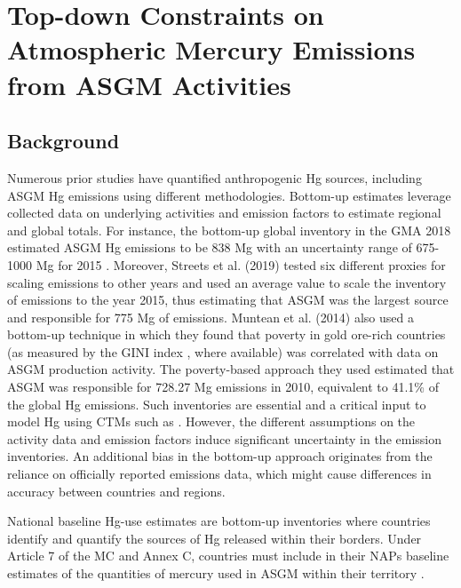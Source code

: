 \chapter{Top-down Constraints on Atmospheric Mercury Emissions from ASGM Activities}
\section{Background}
\begin{flushleft}


 Numerous prior studies have quantified anthropogenic Hg sources, including ASGM Hg emissions using different methodologies. Bottom-up estimates leverage collected data on underlying activities and emission factors to estimate regional and global totals. For instance, the bottom-up global inventory in the GMA 2018 estimated ASGM Hg emissions to be 838 Mg with an uncertainty range of 675-1000 Mg for 2015 \cite{united_nations_environment_programme_technical_2019,steenhuisen_development_2019}. Moreover, Streets et al. (2019) tested six different proxies for scaling emissions to other years and used an average value to scale the inventory of emissions to the year 2015, thus estimating that ASGM was the largest source and responsible for 775 Mg of emissions\cite{streets_global_2019}. Muntean et al. (2014) also used a bottom-up technique in which they found that poverty in gold ore-rich countries (as measured by the GINI index \cite{sadefo_kamdem_nice_2012}, where available) was correlated with data on ASGM production activity. The poverty-based approach they used estimated that ASGM was responsible for 728.27 Mg emissions in 2010, equivalent to 41.1\% of the global Hg emissions\cite{muntean_evaluating_2018}. Such inventories are essential and a critical input to model Hg using CTMs such as \gc. However, the different assumptions on the activity data and emission factors induce significant uncertainty in the emission inventories. An additional bias in the bottom-up approach originates from the reliance on officially reported emissions data, which might cause differences in accuracy between countries and regions. 
 \end{flushleft}
 \begin{flushleft}
    National baseline Hg-use estimates are bottom-up inventories where countries identify and quantify the sources of Hg released within their borders. Under Article 7 of the MC and Annex C, countries must include in their NAPs baseline estimates of the quantities of mercury used in ASGM within their territory \cite{united_nations_environment_programme_estimating_2017}.  
 \end{flushleft}
 



